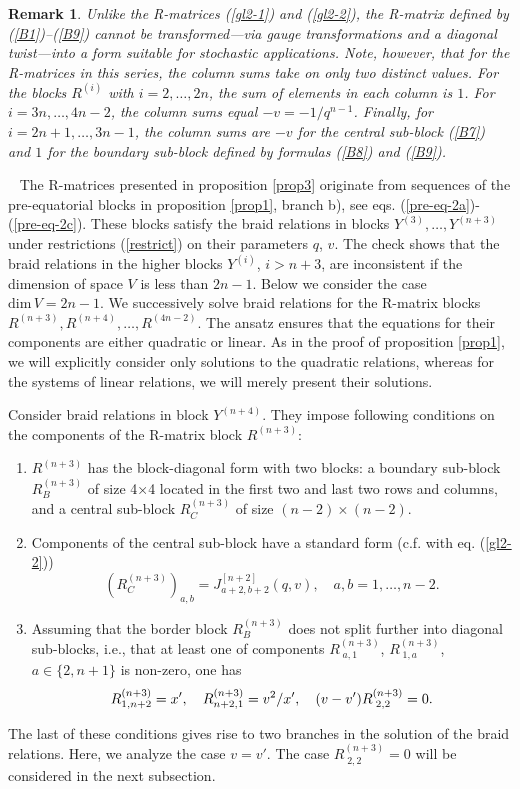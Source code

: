 \documentclass[11pt]{article}
\def\be{\begin{equation}}\def\ee{\end{equation}}
\newcounter{theorem}\def\thetheorem{\thesection.\arabic{theorem}}\makeatletter
\newtheorem{rem}[theorem]{Remark}
\begin{document}
\begin{rem}{\rm
		Unlike the R-matrices (\ref{gl2-1}) and (\ref{gl2-2}), the R-matrix defined by (\ref{B1})–(\ref{B9}) cannot be transformed—via gauge transformations and a diagonal twist—into a form suitable for stochastic applications. Note, however, that for the R-matrices in this series, the column sums take on only two distinct values. For the blocks $R^{(i)}$ with $i=2,\dots,2n$, the sum of elements in each column is $1$. For $i=3n,\dots,4n-2$, the column sums equal $-v=-1/q^{n-1}$. Finally, for $i=2n+1,\dots,3n-1$, the column sums are $-v$ for the central sub-block (\ref{B7}) and $1$ for the boundary sub-block defined by formulas (\ref{B8}) and (\ref{B9}).}
\end{rem}




~
The R-matrices presented in proposition \ref{prop3} originate from sequences of the pre-equatorial blocks in proposition \ref{prop1}, branch b), see eqs. (\ref{pre-eq-2a})-(\ref{pre-eq-2c}).
These blocks satisfy the braid relations in blocks $Y^{(3)}, \dots , Y^{(n+3)}$ under restrictions (\ref{restrict}) on their parameters $q$, $v$. 
The check shows that the braid relations in the higher blocks $Y^{(i)}$, $i>n+3$,  are inconsistent 
if the dimension of  space $V$ is less than $2n - 1$. Below we consider the case 
$\mbox{dim}\, V= 2n-1$. 
We successively solve braid relations for the R-matrix blocks
$R^{(n+3)}, R^{(n+4)}, \dots , R^{(4n-2)}$. The ansatz ensures that the equations for their components are either quadratic or linear. As in the proof of proposition 
\ref{prop1}, we will explicitly consider  only solutions to the quadratic relations, whereas for the systems of linear relations, we will merely present their solutions.
\smallskip

Consider braid relations in block $Y^{(n+4)}$. They impose following conditions on the components of the R-matrix block $R^{(n+3)}$:
\begin{enumerate}
	\item[-]
	$R^{(n+3)}$ has the block-diagonal form with two blocks: a boundary sub-block $R_{B}^{(n+3)}$ of size 4×4 located in the first two and last two rows and columns, and a central 
	sub-block $R_{C}^{(n+3)}$ of size $(n-2)\times(n-2)$.
	\item[-] Components of  the central sub-block have a standard form (c.f. with eq. (\ref{gl2-2}))
	$$
	\left(R_{C}^{(n+3)}\right)_{a,b} = J^{[n+2]}_{a+2,b+2}(q,v), \quad a,b =1,\dots , n-2.
	$$ 
	\item[-] Assuming that the  border block $R_{B}^{(n+3)}$ does not split further into diagonal sub-blocks, i.e., that at least one of components $R^{(n+3)}_{\;a,1}$, $R^{(n+3)}_{\;1,a}$, $a\in\{2,n+1\}$ is  non-zero, one has
	\be
	\lb{branch-2} 
	R^{(n+3)}_{1,n+2}=x', \quad R^{(n+3)}_{n+2,1}={v^2/ x'}, \quad (v-v')R^{(n+3)}_{\;2,2}=0.
	\ee
\end{enumerate}
The last of these conditions gives rise to two branches in the solution of the braid relations. Here, we analyze the case $v=v'$. The case $R^{(n+3)}_{\;2,2}=0$ will be considered  in the next subsection.
\end{document}
